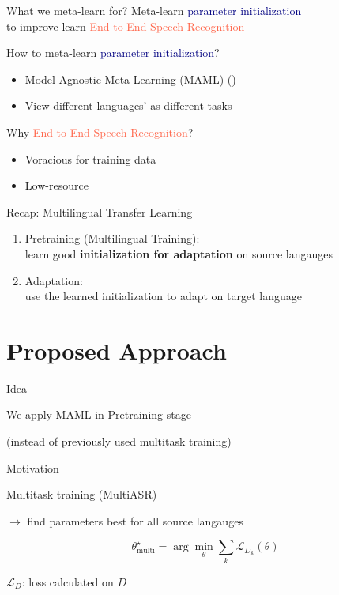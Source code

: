 \documentclass{beamer}
\begin{document}
\begin{frame}[t]{What we meta-learn for?}
  \centering Meta-learn \textcolor{navy}{parameter initialization} \\ to improve learn \textcolor{tomato}{End-to-End Speech Recognition}

  \pause
  \flushleft How to meta-learn \textcolor{navy}{parameter initialization}?
  \begin{itemize}
    \item Model-Agnostic Meta-Learning (MAML) (\citealt{finn2017model})
    \item View different languages' as different tasks
  \end{itemize}

  \pause

  Why \textcolor{tomato}{End-to-End Speech Recognition}?
  \begin{itemize}
    \item Voracious for training data
    \item Low-resource 
  \end{itemize}
\end{frame}


\begin{frame}[t]{Recap: Multilingual Transfer Learning}

  \begin{enumerate}
    \item Pretraining (Multilingual Training): \\ learn good \textbf{initialization for adaptation} on source langauges
    \item Adaptation: \\ use the learned initialization to adapt on target language
  \end{enumerate}
\end{frame}

\section{Proposed Approach}
\begin{frame}[t]{Idea}
	\begin{center}
    \LARGE{We apply MAML in Pretraining stage}
	\end{center}

  \vspace{3em}
  (instead of previously used multitask training)
\end{frame}

\begin{frame}[t]{Motivation}
	\begin{center}
    \LARGE{Multitask training (MultiASR)}
	\end{center}
  \vspace{3em}
  $\rightarrow$ find parameters best for all source langauges

  \begin{equation*}
    \theta_{\text{multi}}^\star = \arg \min_\theta \sum_k \mathcal{L}_{D_k}(\theta)
  \end{equation*}

  $\mathcal{L}_D$: loss calculated on $D$
\end{frame}
\end{document}
